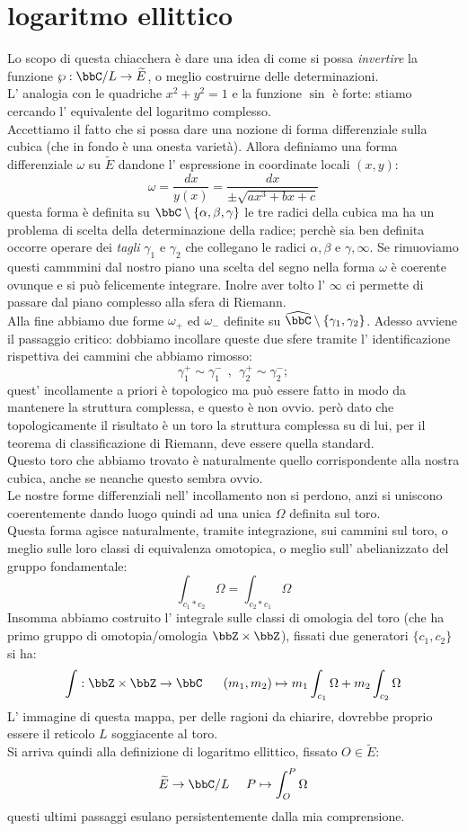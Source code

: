 \section{logaritmo ellittico}
Lo scopo di questa chiacchera è dare una idea di come si possa {\it invertire} la funzione $\wp: \bbC/L \rar \widetilde{E}$, o meglio costruirne delle determinazioni.\\
L' analogia con le quadriche $x^2+y^2=1$ e la funzione $\sin$ è forte: stiamo cercando l' equivalente del logaritmo complesso.\\
Accettiamo il fatto che si possa dare una nozione di forma differenziale sulla cubica (che in fondo è una onesta varietà). Allora definiamo una forma differenziale $\omega$ su $\widetilde{E}$ dandone l' espressione in coordinate locali $(x,y)$:
$$
\omega=\frac{dx}{y(x)}=\frac{dx}{\pm\sqrt{ax^3+bx+c}}
$$
questa forma è definita su $\bbC\setminus\{\alpha, \beta, \gamma\}$ le tre radici della cubica ma ha un problema di scelta della determinazione della radice; perchè sia ben definita occorre operare dei {\it tagli} $\gamma_1$ e $\gamma_2$ che collegano le radici $\alpha,\beta$ e $\gamma,\infty$. Se rimuoviamo questi cammmini dal nostro piano una scelta del segno nella forma $\omega$ è coerente ovunque e si può felicemente integrare. Inolre aver tolto l' $\infty$ ci permette di passare dal piano complesso alla sfera di Riemann.\\
Alla fine abbiamo due forme $\omega_+$ ed $\omega_-$ definite su $\widehat{\bbC}\setminus\{\gamma_1,\gamma_2\}$. Adesso avviene il passaggio critico: dobbiamo incollare queste due sfere tramite l' identificazione rispettiva dei cammini che abbiamo rimosso:
$$
\gamma_1^+\sim \gamma_1^-\ \ , \ \ \gamma_2^+\sim\gamma_2^-;
$$
quest' incollamente a priori è topologico ma può essere fatto in modo da mantenere la struttura complessa, e questo è non ovvio. però dato che topologicamente il risultato è un toro la struttura complessa su di lui, per il teorema di classificazione di Riemann, deve essere quella standard.\\
Questo toro che abbiamo trovato è naturalmente quello corrispondente alla nostra cubica, anche se neanche questo sembra ovvio.\\
Le nostre forme differenziali nell' incollamento non si perdono, anzi si uniscono coerentemente dando luogo quindi ad una unica $\Omega$ definita sul toro.\\
Questa forma agisce naturalmente, tramite integrazione, sui cammini sul toro, o meglio sulle loro classi di equivalenza omotopica, o meglio sull' abelianizzato del gruppo fondamentale:
$$
\int_{c_1 * c_2} \Omega=\int_{c_2 * c_1} \Omega
$$
Insomma abbiamo costruito l' integrale sulle classi di omologia del toro (che ha primo gruppo di omotopia/omologia $\bbZ\times \bbZ $), fissati due generatori $\{c_1,c_2\}$ si ha:
$$
\int: \bbZ\times \bbZ \rar \bbC \ \ \ \ \ (m_1,m_2)\mapsto m_1 \int_{c_1} \Omega+m_2 \int_{c_2} \Omega
$$
L' immagine di questa mappa, per delle ragioni da chiarire, dovrebbe proprio essere il reticolo $L$ soggiacente al toro.\\
Si arriva quindi alla definizione di logaritmo ellittico, fissato $O\in \widetilde{E}$:
$$
\widetilde{E}\rar \bbC/L\ \ \ \ P\mapsto \int_O^P \Omega
$$
questi ultimi passaggi esulano persistentemente dalla mia comprensione.
